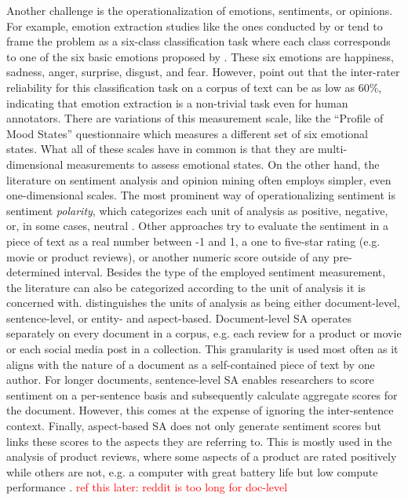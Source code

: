 Another challenge is the operationalization of emotions, sentiments, or opinions. For example, emotion extraction studies like the ones conducted by  or  tend to frame the problem as a six-class classification task where each class corresponds to one of the six basic emotions proposed by . These six emotions are happiness, sadness, anger, surprise, disgust, and fear. However,  point out that the inter-rater reliability for this classification task on a corpus of text can be as low as 60\%, indicating that emotion extraction is a non-trivial task even for human annotators. There are variations of this measurement scale, like the ``Profile of Mood States'' questionnaire  which measures a different set of six emotional states. What all of these scales have in common is that they are multi-dimensional measurements to assess emotional states. \newline
On the other hand, the literature on sentiment analysis and opinion mining often employs simpler, even one-dimensional scales. The most prominent way of operationalizing sentiment is sentiment \emph{polarity}, which categorizes each unit of analysis as positive, negative, or, in some cases, neutral \cite{ravi2015survey}. Other approaches try to evaluate the sentiment in a piece of text as a real number between -1 and 1, a one to five-star rating (e.g. movie or product reviews), or another numeric score outside of any pre-determined interval.\newline
Besides the type of the employed sentiment measurement, the literature can also be categorized according to the unit of analysis it is concerned with.  distinguishes the units of analysis as being either document-level, sentence-level, or entity- and aspect-based. Document-level SA operates separately on every document in a corpus, e.g. each review for a product or movie or each social media post in a collection. This granularity is used most often as it aligns with the nature of a document as a self-contained piece of text by one author. For longer documents, sentence-level SA enables researchers to score sentiment on a per-sentence basis and subsequently calculate aggregate scores for the document. However, this comes at the expense of ignoring the inter-sentence context. Finally, aspect-based SA does not only generate sentiment scores but links these scores to the aspects they are referring to. This is mostly used in the analysis of product reviews, where some aspects of a product are rated positively while others are not, e.g. a computer with great battery life but low compute performance .  \textcolor{red}{ref this later: reddit is too long for doc-level}

